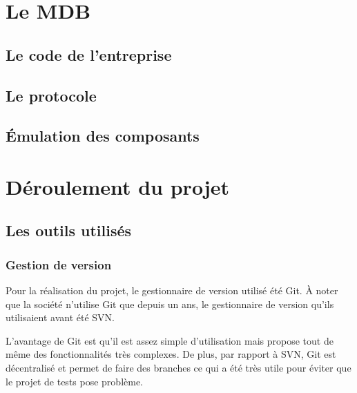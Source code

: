 \documentclass[a4paper]{article}
\begin{document}
\section{Le MDB}

\subsection{Le code de l'entreprise}

\subsection{Le protocole}

\subsection{Émulation des composants}

\section{Déroulement du projet}

\subsection{Les outils utilisés}

\subsubsection{Gestion de version}

Pour la réalisation du projet, le gestionnaire de version utilisé été Git. À
noter que la société n'utilise Git que depuis un ans, le gestionnaire de version
qu'ils utilisaient avant été SVN.

L'avantage de Git est qu'il est assez simple d'utilisation mais propose tout de
même des fonctionnalités très complexes. De plus, par rapport à SVN, Git est
décentralisé et permet de faire des branches ce qui a été très utile pour éviter
que le projet de tests pose problème.
\end{document}

